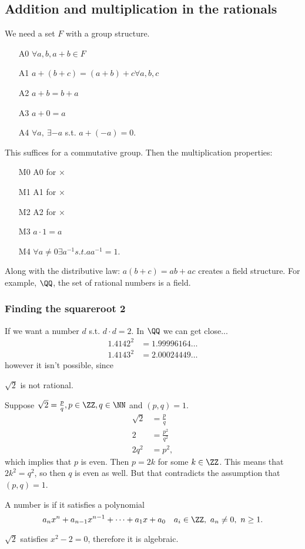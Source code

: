 \documentclass[11pt]{scrartcl}
\numberwithin{equation}{section}
\begin{document}
\subsection{Addition and multiplication in the rationals}
We need a set $F$ with a group structure.
\begin{enumerate}
    \item[A0] $\forall a,b, a+b\in F$
    \item[A1] $a+(b+c) = (a+b)+c\forall a,b,c$
    \item[A2] $a+b=b+a$
    \item[A3] $a+0=a$
    \item[A4] $\forall a, \ \exists-a$ s.t. $a + (-a) = 0$.
\end{enumerate}
This suffices for a commutative group. Then the multiplication properties:
\begin{enumerate}[1.]
    \item[M0] A0 for $\times$
    \item[M1] A1 for $\times$
    \item[M2] A2 for $\times$
    \item[M3] $a\cdot1 = a$
    \item[M4] $\forall a\neq0\exists a^{-1} s.t. aa^{-1}=1$.
\end{enumerate}
Along with the distributive law: $a(b+c) = ab +ac$ creates a field structure. 
For example, $\QQ$, the set of rational numbers is a field.
\subsubsection{Finding the squareroot 2}
If we want a number $d$ s.t. $d\cdot d = 2$. In $\QQ$ we can get close... 
\begin{align*}
    1.4142^2 &= 1.99996164\dots \\
    1.4143^2 &= 2.00024449\dots
\end{align*}
however it isn't possible, since
\begin{claim}
    $\sqrt2$ is not rational.
\end{claim}
\begin{subproof}
    Suppose $\sqrt2 = \frac{p}{q}, p \in \ZZ, q \in \NN$ and $(p,q) = 1$.
    \begin{align*}
        \sqrt{2} &= \frac{p}{q} \\
        2 &= \frac{p^2}{q^2} \\
        2q^2 &= p^2,
    \end{align*}
    which implies that $p$ is even. Then $p = 2k$ for some $k \in \ZZ$.
    This means that $2k^2 = q^2$, so then $q$ is even as well. But that contradicts the assumption that $(p,q)=1$.
\end{subproof}
\begin{definition}
    A number is  if it satisfies a polynomial
    \[ a_nx^n + a_{n-1}x^{n-1}+\cdots+a_1x+a_0 \quad a_i \in \ZZ, \ a_n \neq 0, \ n \geq 1.\]
\end{definition}
$\sqrt2$ satisfies $x^2- 2=0$, therefore it is algebraic.
\clearpage
\end{document}
